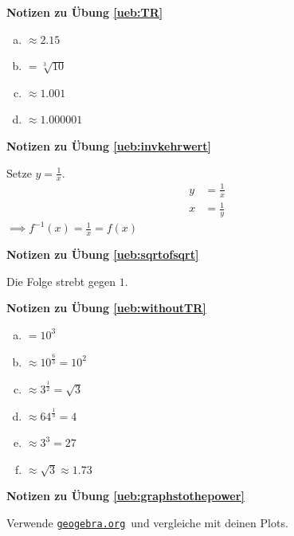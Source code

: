 \documentclass[%
<<<<<<< Updated upstream
11pt,%
twoside,%
titlepage,%
german,%
=======
11pt,%
twoside,%
titlepage,%
swissgerman,%
>>>>>>> Stashed changes
headsepline%
]{scrartcl}
\newcommand{\geogebralink}{\href{https://www.geogebra.org/calculator}{\texttt{geogebra.org}}}
\newcommand{\faReturnGray}{\textcolor{gray}{\faMailReply}} %
\newcommand{\geogebralink}{\href{https://www.geogebra.org/calculator}{\texttt{geogebra.org}}}
\theoremstyle{definition}
\theoremstyle{plain}
\newcommand{\concatueb}[1]{ueb:#1}%
\newcommand{\concatlsg}[1]{lsg:#1}%
\newenvironment{lsg}[1]{%
    \par\noindent\textbf{Notizen zu Übung \ref{\concatueb{#1}}}\label{\concatlsg{#1}}
    \hfill\hyperref[\concatueb{#1}]{\faReturnGray}\par %
}{%
    \par%
}
\newcommand{\concatueb}[1]{ueb:#1}%
\newcommand{\concatlsg}[1]{lsg:#1}%
\newenvironment{lsg}[1]{%
    \par\noindent\textbf{Notizen zu Übung \ref{\concatueb{#1}}.}%
    \label{\concatlsg{#1}}
}{%
    \par%
}
\begin{document}
\begin{lsg}{TR}
  \hypertarget{lsg:TR}{}
  \begin{enumerate}[a)]
    \item $\approx2.15$
    \item $=\sqrt[3]{10}$
    \item $\approx1.001$
    \item $\approx1.000001$
  \end{enumerate}
\end{lsg}

\begin{lsg}{invkehrwert}
  Setze $y=\frac{1}{x}$.
  \begin{align*}
    y &= \frac{1}{x}\tag{$\cdot x$, $\div y$}\\
    x &= \frac{1}{y}
  \end{align*}
    $\implies f^{-1}(x)=\frac{1}{x}=f(x)$
\end{lsg}


\begin{lsg}{sqrtofsqrt}
  Die Folge strebt gegen $1$.
\end{lsg}

\begin{lsg}{withoutTR}
  \begin{enumerate}[a)]
    \item $=10^3$
    \item $\approx10^\frac{6}{3}=10^2$
    \item $\approx3^\frac{1}{2}=\sqrt{3}$
    \item $\approx64^\frac{1}{3}=4$
    \item $\approx3^3=27$
    \item $\approx\sqrt{3}\approx1.73$
  \end{enumerate}
\end{lsg}

\begin{lsg}{graphstothepower}
  Verwende \geogebralink\   und vergleiche mit deinen Plots.
\end{lsg}
\end{document}
